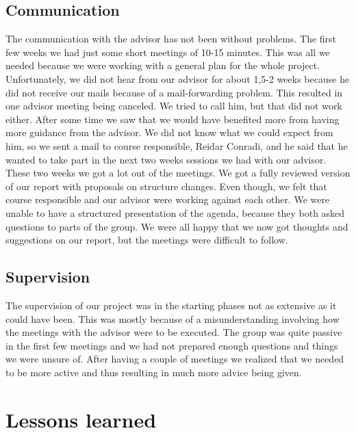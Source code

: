 \subsection{Communication}
The communication with the advisor has not been without problems. The first few weeks we had just some short meetings of 10-15 minutes. This was all we needed because we were working with a general plan for the whole project.
\newline
\newline
Unfortunately, we did not hear from our advisor for about 1,5-2 weeks because he did not receive our mails because of a mail-forwarding problem. This resulted in one advisor meeting being canceled. We tried to call him, but that did not work either.
\newline
\newline
After some time we saw that we would have benefited more from having more guidance from the advisor. We did not know what we could expect from him, so we sent a mail to course responsible, Reidar Conradi, and he said that he wanted to take part in the next two weeks sessions we had with our advisor.
\newline
\newline
These two weeks we got a lot out of the meetings. We got a fully reviewed version of our report with proposals on structure changes. Even though, we felt that course responsible and our advisor were working against each other. We were unable to have a structured presentation of the agenda, because they both asked questions to parts of the group. We were all happy that we now got thoughts and suggestions on our report, but the meetings were difficult to follow.

\subsection{Supervision}
The supervision of our project was in the starting phases not as extensive as it could have been. This was mostly because of a misunderstanding involving how the meetings with the advisor were to be executed. The group was quite passive in the first few meetings and we had not prepared enough questions and things we were unsure of. After having a couple of meetings we realized that we needed to be more active and thus resulting in much more advice being given.

\section{Lessons learned}\label{sec:refl_lessons}

